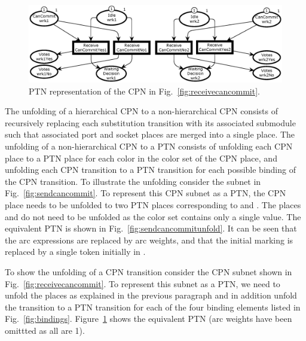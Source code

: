\begin{figure}[t!!!!!]
\centering
\includegraphics[scale=.43]{figures/PTReceiveCanCommitBoth.eps}
\caption{PTN representation of the CPN in Fig.~\ref{fig:receivecancommit}.}
\label{fig:receivecancommitunfold}
\end{figure}


The unfolding of a hierarchical CPN to a non-hierarchical CPN consists
of recursively replacing each substitution transition with its
associated submodule such that associated port and socket places are
merged into a single place. The unfolding of a non-hierarchical CPN to
a PTN consists of unfolding each CPN place to a PTN place for each
color in the color set of the CPN place, and unfolding each CPN
transition to a PTN transition for each possible binding of the CPN
transition.  To illustrate the unfolding consider the subnet in
Fig.~\ref{fig:sendcancommit}. To represent this CPN subnet as a PTN,
the CPN place  needs to be unfolded to two PTN
places corresponding to  and . The
places  and  do not need to be
unfolded as the  color set contains only a single
value. The equivalent PTN is shown in
Fig.~\ref{fig:sendcancommitunfold}. It can be seen that the arc
expressions are replaced by arc weights, and that the initial marking
is replaced by a single token initially in .

To show the unfolding of a CPN transition consider the CPN subnet
shown in Fig.~\ref{fig:receivecancommit}. To represent this subnet as
a PTN, we need to unfold the places as explained in the previous
paragraph and in addition unfold the transition
 to a PTN transition for each of the four
binding elements listed in
Fig.~\ref{fig:bindings}. Figure~\ref{fig:receivecancommitunfold} shows
the equivalent PTN (arc weights have been omittted as all are 1).


